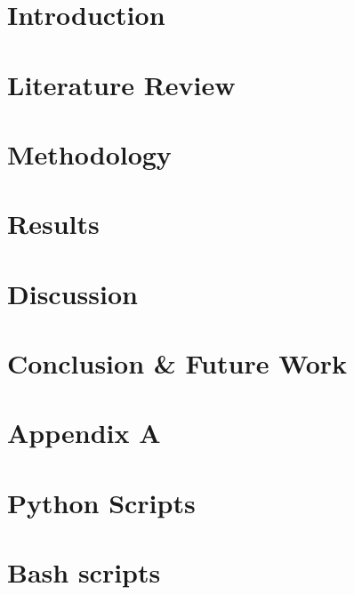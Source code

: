 \documentclass[11pt]{report}
\begin{document}


\newpage
\tableofcontents
\listoffigures
\listoftables
\lstlistoflistings
\newpage

\begin{abstract}
  \lipsum[1-3]
\end{abstract}
\onehalfspacing
\chapter{Introduction}
\lipsum[1-3]
% 
% 

\chapter{Literature Review}



\chapter{Methodology}

\chapter{Results}
\lipsum[1-3]

\chapter{Discussion}
\lipsum[1-3]

\chapter{Conclusion \& Future Work }
\lipsum[1-3]




\appendix
\chapter{Appendix A}
\FloatBarrier
\chapter{Python Scripts}
\label{appPythonScripts}

\FloatBarrier
\chapter{Bash scripts}
\label{appBashScripts}

\clearpage
{}
\printindex
\end{document}
